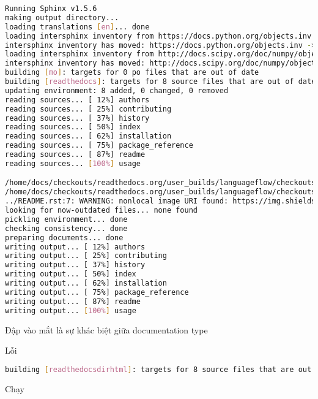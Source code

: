 \begin{lstlisting}[language=bash]
Running Sphinx v1.5.6
making output directory...
loading translations [en]... done
loading intersphinx inventory from https://docs.python.org/objects.inv...
intersphinx inventory has moved: https://docs.python.org/objects.inv -> https://docs.python.org/2/objects.inv
loading intersphinx inventory from http://docs.scipy.org/doc/numpy/objects.inv...
intersphinx inventory has moved: http://docs.scipy.org/doc/numpy/objects.inv -> https://docs.scipy.org/doc/numpy/objects.inv
building [mo]: targets for 0 po files that are out of date
building [readthedocs]: targets for 8 source files that are out of date
updating environment: 8 added, 0 changed, 0 removed
reading sources... [ 12%] authors
reading sources... [ 25%] contributing
reading sources... [ 37%] history
reading sources... [ 50%] index
reading sources... [ 62%] installation
reading sources... [ 75%] package_reference
reading sources... [ 87%] readme
reading sources... [100%] usage

/home/docs/checkouts/readthedocs.org/user_builds/languageflow/checkouts/develop/languageflow/transformer/count.py:docstring of languageflow.transformer.count.CountVectorizer:106: WARNING: Definition list ends without a blank line; unexpected unindent.
/home/docs/checkouts/readthedocs.org/user_builds/languageflow/checkouts/develop/languageflow/transformer/tfidf.py:docstring of languageflow.transformer.tfidf.TfidfVectorizer:113: WARNING: Definition list ends without a blank line; unexpected unindent.
../README.rst:7: WARNING: nonlocal image URI found: https://img.shields.io/badge/latest-1.1.6-brightgreen.svg
looking for now-outdated files... none found
pickling environment... done
checking consistency... done
preparing documents... done
writing output... [ 12%] authors
writing output... [ 25%] contributing
writing output... [ 37%] history
writing output... [ 50%] index
writing output... [ 62%] installation
writing output... [ 75%] package_reference
writing output... [ 87%] readme
writing output... [100%] usage
\end{lstlisting}

Đập vào mắt là sự khác biệt giữa documentation type

Lỗi

\begin{lstlisting}[language=bash]
building [readthedocsdirhtml]: targets for 8 source files that are out of date
\end{lstlisting}

Chạy


